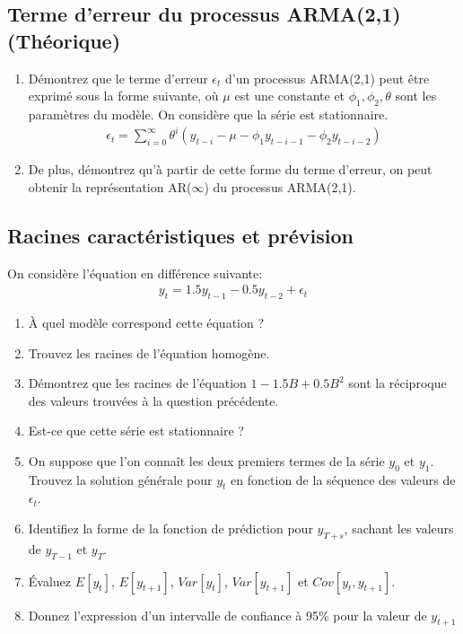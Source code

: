 \documentclass[11pt,english,francais]{article}
\begin{document}
\subsection{Terme d'erreur du processus ARMA(2,1) (Théorique)}

\begin{enumerate}
\item Démontrez que le terme d'erreur $\epsilon_t$ d'un processus ARMA(2,1) peut être exprimé sous la forme suivante, où $\mu$ est une constante et $\phi_1, \phi_2, \theta$ sont les paramètres du modèle. On considère que la série est stationnaire.
\begin{align*}
  \epsilon_t = \sum_{i=0}^{\infty} \theta^i \left(y_{t-i} - \mu - \phi_1 y_{t-i-1} - \phi_2 y_{t-i-2} \right)
\end{align*}

\item De plus, démontrez qu'à partir de cette forme du terme d'erreur, on peut obtenir la représentation AR($\infty$) du processus ARMA(2,1).
\end{enumerate}

\subsection{Racines caractéristiques et prévision}

On considère l'équation en différence suivante:
\begin{align*}
  y_t = 1.5 y_{t-1} - 0.5 y_{t-2} + \epsilon_t
\end{align*}
\begin{enumerate}
\item À quel modèle correspond cette équation ?
\item Trouvez les racines de l'équation homogène.
\item Démontrez que les racines de l'équation $1-1.5B+0.5B^2$ sont la réciproque des valeurs trouvées à la question précédente.
\item Est-ce que cette série est stationnaire ?
\item On suppose que l'on connaît les deux premiers termes de la série $y_0$ et $y_1$. Trouvez la solution générale pour $y_t$ en fonction de la séquence des valeurs de $\epsilon_t$.
\item Identifiez la forme de la fonction de prédiction pour $y_{T+s}$, sachant les valeurs de $y_{T-1}$ et $y_T$.
\item Évaluez $E[y_t]$, $E[y_{t+1}]$, $Var[y_t]$, $Var[y_{t+1}]$ et $Cov[y_{t},y_{t+1}]$.
\item Donnez l'expression d'un intervalle de confiance à 95\% pour la valeur de $y_{t+1}$ 
\end{enumerate}

\clearpage


\end{document}
